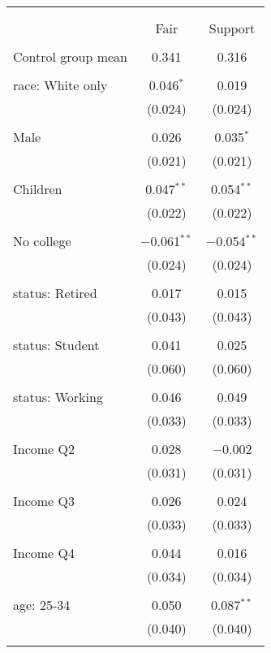 
\begin{tabular}{@{\extracolsep{5pt}}lcc} 
\\[-1.8ex]\hline 
\hline \\[-1.8ex] 
\\[-1.8ex] & Fair & Support \\ 
\hline \\[-1.8ex] 
 Control group mean & 0.341 & 0.316  \\ \hline \\[-1.8ex] race: White only & 0.046$^{*}$ & 0.019 \\ 
  & (0.024) & (0.024) \\ 
  & & \\ 
 Male & 0.026 & 0.035$^{*}$ \\ 
  & (0.021) & (0.021) \\ 
  & & \\ 
 Children & 0.047$^{**}$ & 0.054$^{**}$ \\ 
  & (0.022) & (0.022) \\ 
  & & \\ 
 No college & $-$0.061$^{**}$ & $-$0.054$^{**}$ \\ 
  & (0.024) & (0.024) \\ 
  & & \\ 
 status: Retired & 0.017 & 0.015 \\ 
  & (0.043) & (0.043) \\ 
  & & \\ 
 status: Student & 0.041 & 0.025 \\ 
  & (0.060) & (0.060) \\ 
  & & \\ 
 status: Working & 0.046 & 0.049 \\ 
  & (0.033) & (0.033) \\ 
  & & \\ 
 Income Q2 & 0.028 & $-$0.002 \\ 
  & (0.031) & (0.031) \\ 
  & & \\ 
 Income Q3 & 0.026 & 0.024 \\ 
  & (0.033) & (0.033) \\ 
  & & \\ 
 Income Q4 & 0.044 & 0.016 \\ 
  & (0.034) & (0.034) \\ 
  & & \\ 
 age: 25-34 & 0.050 & 0.087$^{**}$ \\ 
  & (0.040) & (0.040) \\ 
  & & \\ 

\end{tabular}
